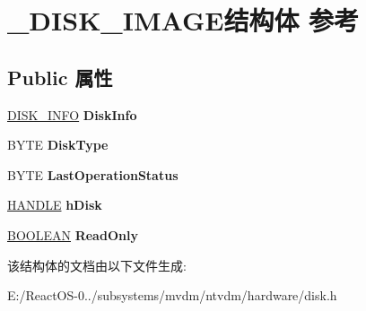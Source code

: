 \hypertarget{struct___d_i_s_k___i_m_a_g_e}{}\section{\+\_\+\+D\+I\+S\+K\+\_\+\+I\+M\+A\+G\+E结构体 参考}
\label{struct___d_i_s_k___i_m_a_g_e}
\subsection*{Public 属性}
\begin{DoxyCompactItemize}
\item 
\mbox{\label{struct___d_i_s_k___i_m_a_g_e_a3c5a16472a2496d009594a5ff726095e}} 
\hyperlink{struct___d_i_s_k___i_n_f_o}{D\+I\+S\+K\+\_\+\+I\+N\+FO} {\bfseries Disk\+Info}
\item 
\mbox{\label{struct___d_i_s_k___i_m_a_g_e_a6ff4033cb96aa94eb521f5f911c0b6da}} 
B\+Y\+TE {\bfseries Disk\+Type}
\item 
\mbox{\label{struct___d_i_s_k___i_m_a_g_e_aa4120b49d67820f274fa5dd6f40a0ea4}} 
B\+Y\+TE {\bfseries Last\+Operation\+Status}
\item 
\mbox{\label{struct___d_i_s_k___i_m_a_g_e_a2f9806e5ab83f442274518f047692631}} 
\hyperlink{interfacevoid}{H\+A\+N\+D\+LE} {\bfseries h\+Disk}
\item 
\mbox{\label{struct___d_i_s_k___i_m_a_g_e_a48d8ca6a44169f077a6b71c15abf0103}} 
\hyperlink{_processor_bind_8h_a112e3146cb38b6ee95e64d85842e380a}{B\+O\+O\+L\+E\+AN} {\bfseries Read\+Only}
\end{DoxyCompactItemize}


该结构体的文档由以下文件生成\+:\begin{DoxyCompactItemize}
\item 
E\+:/\+React\+O\+S-\/0../subsystems/mvdm/ntvdm/hardware/disk.\+h\end{DoxyCompactItemize}
